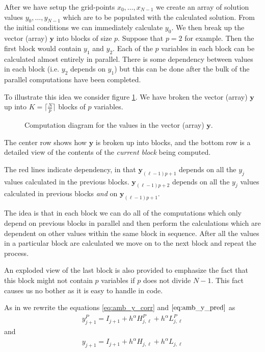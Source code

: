 After we have setup the grid-points $ x_0, \ldots, x_{N-1} $ we create an array of solution values $ y_0, \ldots, y_{N-1} $ which are to be populated with the calculated solution. From the initial conditions we can immediately calculate $ y_0 $. We then break up the vector (array) $ \mathbf{y} $ into blocks of size $ p $. Suppose that $ p = 2 $ for example. Then the first block would contain $ y_1 $ and $ y_2 $. Each of the $ p $ variables in each block can be calculated almost entirely in parallel. There is some dependency between values in each block (i.e. $ y_2 $ depends on $ y_1 $) but this can be done after the bulk of the parallel computations have been completed.

To illustrate this idea we consider figure \ref{fig:comp_diag}. We have broken the vector (array) $ \mathbf{y} $ up into $ K = \lceil \frac{N}{p} \rceil $ blocks of $ p $ variables.


\begin{figure}[h]

\caption{Computation diagram for the values in the vector (array) $ \mathbf{y} $.}
\label{fig:comp_diag}
\end{figure} 

The center row shows how $ \mathbf{y} $ is broken up into blocks, and the bottom row is a detailed view
of the contents of the \emph{current block} being computed.

The red lines indicate dependency, in that $ \mathbf{y}_{(\ell - 1)p + 1} $ depends on all the $ y_j $ values calculated in the previous blocks. $ \mathbf{y}_{(\ell - 1)p + 2} $ depends on all the $ y_j $ values calculated in previous blocks \emph{and} on $ \mathbf{y}_{(\ell - 1)p + 1 } $. 

The idea is that in each block we can do all of the computations which only depend on previous blocks in parallel and then perform the calculations which are dependent on other values within the same block in sequence. After all the values in a particular block are calculated we move on to the next block and repeat the process.

An exploded view of the last block is also provided to emphasize the fact that this block might not contain $ p $ variables if $ p $ does not divide $ N - 1 $. This fact causes us no bother as it is easy to handle in code.

As in \cite{Diethelm2011} we rewrite the equations \eqref{eq:amb_y_corr} and $ \eqref{eq:amb_y_pred} $ as
\begin{align}
y_{j+1}^P = I_{j+1} + h^\alpha H_{j,\ell}^P + h^\alpha L_{j,\ell}^P
\end{align}
and
\begin{align}
y_{j+1} = I_{j+1} + h^{\alpha} H_{j,\ell} + h^\alpha L_{j,\ell}
\end{align}

